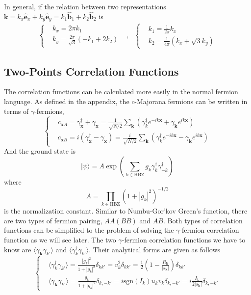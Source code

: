 \documentclass[12font]{article}
\numberwithin{equation}{section}    %
\theoremstyle{definition}
\newcommand{\ket}[1]{| #1 \rangle}
\newcommand{\anglelr}[1]{\langle #1 \rangle}
\newcommand{\lr}[1]{\left(  #1  \right)}
\newcommand{\abs}[1]{\left|  #1  \right|}
\newcommand{\mrm}[1]{\mathrm{#1}}
\newcommand{\bo}[1]{\mathbf{#1}}
\begin{document}
In general, if the relation between two representations $\bo{k} = k_x\hat{\bo{e}}_x + k_y\hat{\bo{e}}_y = k_1\hat{\bo{b}}_1 + k_2\hat{\bo{b}}_2$ is
\[
\begin{array}{ccc}
    \left\{
    \begin{aligned}
        & k_x = 2\pi k_1 \\
        & k_y = \frac{2\pi}{\sqrt{3}}\lr{-k_1 + 2k_2}
    \end{aligned}
    \right.
    &  
    ,
    &
    \left\{
    \begin{aligned}
        & k_1 = \frac{1}{2\pi} k_x \\
        & k_2 = \frac{1}{4\pi}\lr{k_x + \sqrt{3}k_y}
    \end{aligned}
    \right.
\end{array}
\]


\subsection{Two-Points Correlation Functions}
The correlation functions can be calculated more easily in the normal fermion language. As defined in the appendix, the $c$-Majorana fermions can be written in terms of $\gamma$-fermions,
\[
\left\{
\begin{aligned}
& c_{\bo{x}A} =  \gamma^\dagger_{\bo{x}} + \gamma_{\bo{x}} = \frac{1}{\sqrt{N/2}}\sum_{\bo{k}}\lr{\gamma^\dagger_k e^{-ik\bo{x}} + \gamma_{\bo{k}} e^{ik\bo{x}}} \\
& c_{\bo{x}B} = i\lr{\gamma^\dagger_{\bo{x}} - \gamma_{\bo{x}}} = \frac{i}{\sqrt{N/2}}\sum_{\bo{k}}\lr{\gamma^\dagger_k e^{-ik\bo{x}} - \gamma_{\bo{k}} e^{ik\bo{x}}}
\end{aligned}
\right.
\]
And the ground state is 
\[
\ket{\psi} = A\exp\lr{\sum_{k\in\mrm{HBZ}}g_k\gamma^\dagger_k\gamma^\dagger_{-k}}
\]
where 
\[
A = \prod_{k\in\mrm{HBZ}}\lr{1 + \abs{g_k}^2}^{-1/2}
\]
is the normalization constant. Similar to Numbu-Gor'kov Green's function, there are two types of fermion pairing, $AA(BB)$ and $AB$. Both types of correlation functions can be simplified to the problem of solving the $\gamma$-fermion correlation function as we will see later. The two $\gamma$-fermion correlation functions we have to know are $\anglelr{\gamma_{\bo{k}}\gamma_{k'}}$ and $\anglelr{\gamma^\dagger_k\gamma_{k'}}$. Their analytical forms are given as follows
\[
\left\{
\begin{aligned}
& \anglelr{\gamma^\dagger_k \gamma_{k'}} = \frac{\abs{g_k}^2}{1+\abs{g_k}^2}\delta_{kk'} = v_k^2\delta_{kk'} = \frac{1}{2}\lr{1-\frac{R_{\bo{k}}}{\abs{s_{\bo{k}}}}}\delta_{kk'}\\
& \anglelr{\gamma_{\bo{k}}\gamma_{k'}} = \frac{g_k}{1+\abs{g_k}^2}\delta_{k,-k'} = i\mrm{sgn}\lr{I_k}u_kv_k\delta_{k,-k'} = i\frac{I_k}{2\abs{s_{\bo{k}}}}\delta_{k,-k'}
\end{aligned}
\right.
\]
\end{document}
